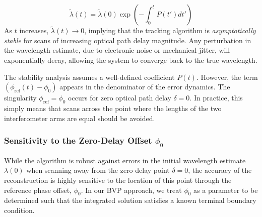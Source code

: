 \documentclass[12pt]{report}
\begin{document}
	\begin{equation}
		\tilde{\lambda}(t) = \tilde{\lambda}(0) \exp\left( -\int_{0}^{t} P(t') dt' \right)
	\end{equation}
	As $t$ increases, $ \tilde{\lambda}(t) \to 0$, implying that the tracking algorithm is \textit{asymptotically stable} for scans of increasing optical path delay magnitude. Any perturbation in the wavelength estimate, due to electronic noise or mechanical jitter, will exponentially decay, allowing the system to converge back to the true wavelength.
	
	The stability analysis assumes a well-defined coefficient $P(t)$. However, the term $(\phi_\mathrm{ref}(t) - \phi_0)$ appears in the denominator of the error dynamics. The singularity $\phi_\mathrm{ref} = \phi_0$ occurs for zero optical path delay $\delta =0$. In practice, this simply means that scans across the point where the lengths of the two interferometer arms are equal should be avoided.
	
	\subsubsection{Sensitivity to the Zero-Delay Offset $\phi_0$}
	While the algorithm is robust against errors in the initial wavelength estimate $\lambda(0)$ when scanning away from the zero delay point $\delta = 0$, the accuracy of the reconstruction is highly sensitive to the location of this point through the reference phase offset, $\phi_0$. In our BVP approach, we treat $\phi_0$ as a parameter to be determined such that the integrated solution satisfies a known terminal boundary condition. 
	
	
	
\end{document}
